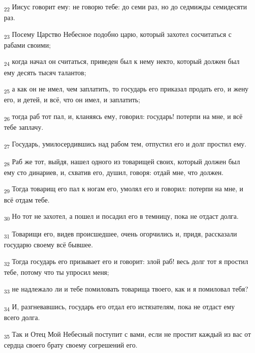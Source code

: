 \begin{tcolorbox}
\textsubscript{22} Иисус говорит ему: не говорю тебе: до семи раз, но до седмижды семидесяти раз.
\end{tcolorbox}
\begin{tcolorbox}
\textsubscript{23} Посему Царство Небесное подобно царю, который захотел сосчитаться с рабами своими;
\end{tcolorbox}
\begin{tcolorbox}
\textsubscript{24} когда начал он считаться, приведен был к нему некто, который должен был ему десять тысяч талантов;
\end{tcolorbox}
\begin{tcolorbox}
\textsubscript{25} а как он не имел, чем заплатить, то государь его приказал продать его, и жену его, и детей, и всё, что он имел, и заплатить;
\end{tcolorbox}
\begin{tcolorbox}
\textsubscript{26} тогда раб тот пал, и, кланяясь ему, говорил: государь! потерпи на мне, и всё тебе заплачу.
\end{tcolorbox}
\begin{tcolorbox}
\textsubscript{27} Государь, умилосердившись над рабом тем, отпустил его и долг простил ему.
\end{tcolorbox}
\begin{tcolorbox}
\textsubscript{28} Раб же тот, выйдя, нашел одного из товарищей своих, который должен был ему сто динариев, и, схватив его, душил, говоря: отдай мне, что должен.
\end{tcolorbox}
\begin{tcolorbox}
\textsubscript{29} Тогда товарищ его пал к ногам его, умолял его и говорил: потерпи на мне, и всё отдам тебе.
\end{tcolorbox}
\begin{tcolorbox}
\textsubscript{30} Но тот не захотел, а пошел и посадил его в темницу, пока не отдаст долга.
\end{tcolorbox}
\begin{tcolorbox}
\textsubscript{31} Товарищи его, видев происшедшее, очень огорчились и, придя, рассказали государю своему всё бывшее.
\end{tcolorbox}
\begin{tcolorbox}
\textsubscript{32} Тогда государь его призывает его и говорит: злой раб! весь долг тот я простил тебе, потому что ты упросил меня;
\end{tcolorbox}
\begin{tcolorbox}
\textsubscript{33} не надлежало ли и тебе помиловать товарища твоего, как и я помиловал тебя?
\end{tcolorbox}
\begin{tcolorbox}
\textsubscript{34} И, разгневавшись, государь его отдал его истязателям, пока не отдаст ему всего долга.
\end{tcolorbox}
\begin{tcolorbox}
\textsubscript{35} Так и Отец Мой Небесный поступит с вами, если не простит каждый из вас от сердца своего брату своему согрешений его.
\end{tcolorbox}
